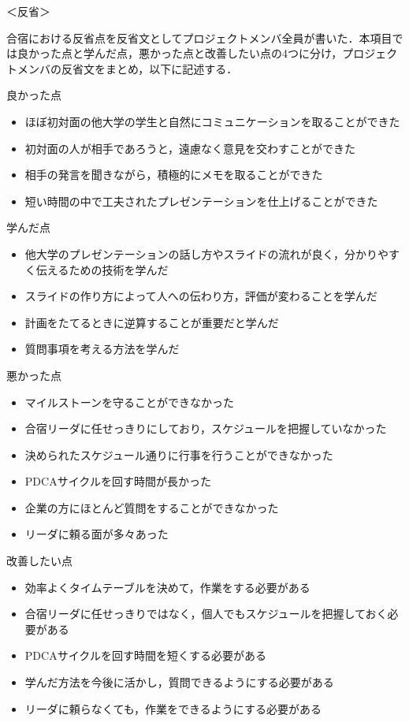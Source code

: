 \par
＜反省＞
\par
合宿における反省点を反省文としてプロジェクトメンバ全員が書いた．本項目では良かった点と学んだ点，悪かった点と改善したい点の4つに分け，プロジェクトメンバの反省文をまとめ，以下に記述する．
\par
良かった点
\begin{itemize}
\item ほぼ初対面の他大学の学生と自然にコミュニケーションを取ることができた
\item 初対面の人が相手であろうと，遠慮なく意見を交わすことができた
\item 相手の発言を聞きながら，積極的にメモを取ることができた
\item 短い時間の中で工夫されたプレゼンテーションを仕上げることができた
\end{itemize}
\par
学んだ点
\begin{itemize}
\item 他大学のプレゼンテーションの話し方やスライドの流れが良く，分かりやすく伝えるための技術を学んだ
\item スライドの作り方によって人への伝わり方，評価が変わることを学んだ
\item 計画をたてるときに逆算することが重要だと学んだ
\item 質問事項を考える方法を学んだ
\end{itemize}
\par
悪かった点
\begin{itemize}
\item マイルストーンを守ることができなかった
\item 合宿リーダに任せっきりにしており，スケジュールを把握していなかった
\item 決められたスケジュール通りに行事を行うことができなかった
\item PDCAサイクルを回す時間が長かった
\item 企業の方にほとんど質問をすることができなかった
\item リーダに頼る面が多々あった
\end{itemize}
\par
改善したい点
\begin{itemize}
\item 効率よくタイムテーブルを決めて，作業をする必要がある
\item 合宿リーダに任せっきりではなく，個人でもスケジュールを把握しておく必要がある
\item PDCAサイクルを回す時間を短くする必要がある
\item 学んだ方法を今後に活かし，質問できるようにする必要がある
\item リーダに頼らなくても，作業をできるようにする必要がある
\end{itemize}
